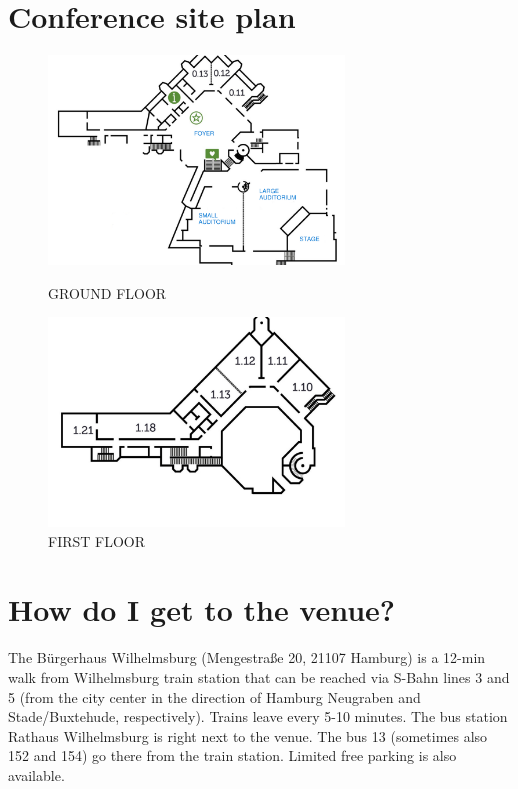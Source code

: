 
\setlength{\parskip}{1em}   

\section*{Conference site plan}

\begin{figure}[H]
	\centering
	\includegraphics[width=0.7\textwidth]{pdf_static/ground_floor.pdf}
	\caption*{GROUND FLOOR}
	\includegraphics[width=0.7\textwidth]{pdf_static/first_floor.pdf}
	\caption*{FIRST FLOOR}
\end{figure}


\section*{How do I get to the venue?}

The Bürgerhaus Wilhelmsburg (Mengestraße 20, 21107 Hamburg) is a 12-min walk from Wilhelmsburg train station that can be reached via S-Bahn lines 3 and 5 (from the city center in the direction of Hamburg Neugraben and Stade/Buxtehude, respectively). Trains leave every 5-10 minutes. 
The bus station Rathaus Wilhelmsburg is right next to the venue. The bus 13 (sometimes also 152 and 154) go there from the train station.
Limited free parking is also available.

